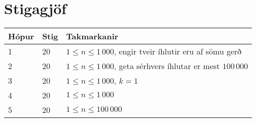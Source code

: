 \section*{Stigagjöf}
\begin{tabular}{|l|l|l|}
\hline
Hópur & Stig & Takmarkanir \\ \hline
1     & 20   & $1 \leq n \leq 1\,000$, engir tveir íhlutir eru af sömu gerð \\ \hline
2     & 20   & $1 \leq n \leq 1\,000$, geta sérhvers íhlutar er mest $100\,000$ \\ \hline
3     & 20   & $1 \leq n \leq 1\,000$, $k = 1$ \\ \hline
4     & 20   & $1 \leq n \leq 1\,000$ \\ \hline
5     & 20   & $1 \leq n \leq 100\,000$ \\ \hline
\end{tabular}

